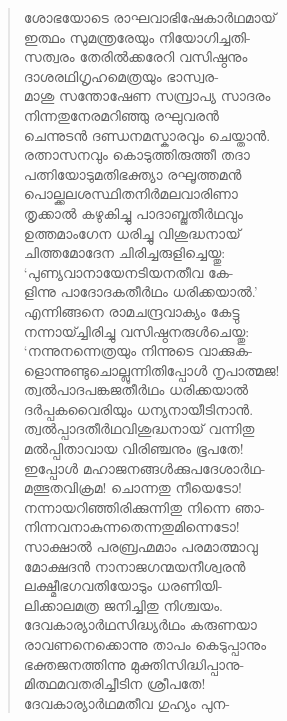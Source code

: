 \begin{verse}
ശോഭയോടെ രാഘവാഭിഷേകാര്‍ഥമായ്\\
ഇത്ഥം സുമന്ത്രരേയും നിയോഗിച്ചതി-\\
സത്വരം തേരില്‍ക്കരേറി വസിഷ്ഠനും\\
ദാശരഥിഗൃഹമെത്രയും ഭാസ്വര-\\
മാശു സന്തോഷേണ സമ്പ്രാപ്യ സാദരം\\
നിന്നതുനേരമറിഞ്ഞു രഘുവരന്‍\\
ചെന്നുടന്‍ ദണ്ഡനമസ്കാരവും ചെയ്താന്‍.\\
രത്നാസനവും കൊടുത്തിരുത്തീ തദാ\\
പത്നിയോടുമതിഭക്ത്യാ രഘൂത്തമന്‍\\
പൊല്ക്കലശസ്ഥിതനിര്‍മലവാരിണാ\\
തൃക്കാല്‍ കഴുകിച്ചു പാദാബ്ജതീര്‍ഥവും\\
ഉത്തമാംഗേന ധരിച്ചു വിശുദ്ധനായ്\\
ചിത്തമോദേന ചിരിച്ചരുളിച്ചെയ്തു:\\
‘പുണ്യവാനായേനടിയനതീവ കേ-\\
ളിന്നു പാദോദകതീര്‍ഥം ധരിക്കയാല്‍.’\\
എന്നിങ്ങനെ രാമചന്ദ്രവാക്യം കേട്ടു\\
നന്നായ്ച്ചിരിച്ചു വസിഷ്ഠനരുള്‍ചെയ്തു:\\
‘നന്നുനന്നെത്രയും നിന്നുടെ വാക്കുക-\\
ളൊന്നുണ്ടുചൊല്ലുന്നിതിപ്പോള്‍ നൃപാത്മജ!\\
ത്വല്‍പാദപങ്കജതീര്‍ഥം ധരിക്കയാല്‍\\
ദര്‍പ്പകവൈരിയും ധന്യനായീടിനാന്‍.\\
ത്വല്‍പ്പാദതീര്‍ഥവിശുദ്ധനായ് വന്നിതു\\
മല്‍പ്പിതാവായ വിരിഞ്ചനും ഭൂപതേ!\\
ഇപ്പോള്‍ മഹാജനങ്ങള്‍ക്കുപദേശാര്‍ഥ-\\
മത്ഭുതവിക്രമ! ചൊന്നതു നീയെടോ!\\
നന്നായറിഞ്ഞിരിക്കുന്നിതു നിന്നെ ഞാ-\\
നിന്നവനാകുന്നതെന്നതുമിന്നെടോ!\\
സാക്ഷാല്‍ പരബ്രഹ്മമാം പരമാത്മാവു\\
മോക്ഷദന്‍ നാനാജഗന്മയനീശ്വരന്‍\\
ലക്ഷ്മീഭഗവതിയോടും ധരണിയി-\\
ലിക്കാലമത്ര ജനിച്ചിതു നിശ്ചയം.\\
ദേവകാര്യാര്‍ഥസിദ്ധ്യര്‍ഥം കരുണയാ\\
രാവണനെക്കൊന്നു താപം കെടുപ്പാനും\\
ഭക്തജനത്തിന്നു മുക്തിസിദ്ധിപ്പാനു-\\
മിത്ഥമവതരിച്ചീടിന ശ്രീപതേ!\\
ദേവകാര്യാര്‍ഥമതീവ ഗുഹ്യം പുന-\\

\end{verse}
